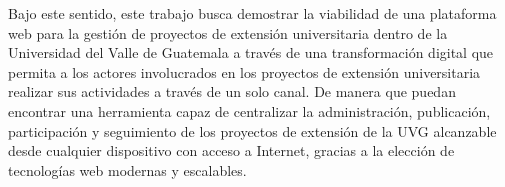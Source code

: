 Bajo este sentido, este trabajo busca demostrar la viabilidad de una plataforma web para la gestión de proyectos de
extensión universitaria dentro de la Universidad del Valle de Guatemala a través de una transformación digital que
permita a los actores involucrados en los proyectos de extensión universitaria realizar sus actividades a través de un
solo canal. De manera que puedan encontrar una herramienta capaz de centralizar la administración, publicación, participación
y seguimiento de los proyectos de extensión de la UVG alcanzable desde cualquier dispositivo con acceso a Internet, gracias
a la elección de tecnologías web modernas y escalables.

